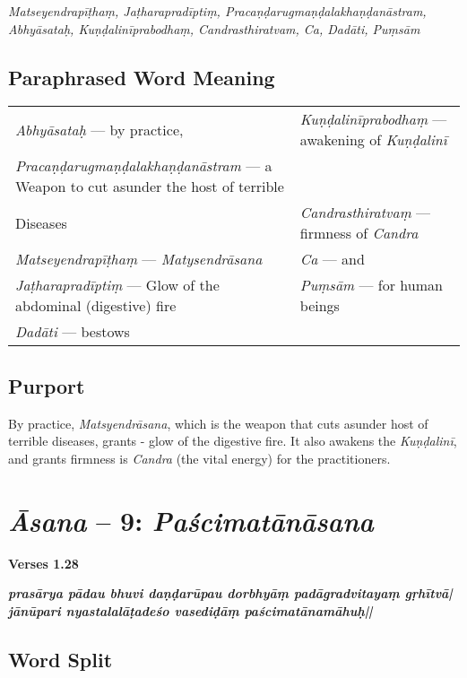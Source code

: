 \textit{Matseyendrapīṭhaṃ,  Jaṭharapradīptiṃ,  Pracaṇḍarugmaṇḍalakhaṇḍanāstram, 
Abhyāsataḥ, Kuṇḍalinīprabodhaṃ,  Candrasthiratvam, Ca, Dadāti, Puṃsām}

\subsection*{Paraphrased Word Meaning}

\begin{longtable}{>{\noindent\raggedright}p{5cm}>{\noindent\raggedright}p{5cm}}
\textit{Abhyāsataḥ} --- by practice, & \textit{Kuṇḍalinīprabodhaṃ} --- awakening of \textit{Kuṇḍalinī}\tabularnewline
\textit{Pracaṇḍarugmaṇḍala\-khaṇḍa\-nāstram} --- a Weapon to cut asunder the host  of terrible\tabularnewline 
Diseases & \textit{Candrasthiratvaṃ} --- firmness  of \textit{Candra}\tabularnewline
\textit{Matseyendrapīṭhaṃ} --- \textit{Matysendrāsana} & \textit{Ca} --- and\tabularnewline
\textit{Jaṭharapradīptiṃ} --- Glow of the  abdominal (digestive) fire & \textit{Puṃsām} --- for human beings\tabularnewline
\textit{Dadāti} --- bestows & 
\end{longtable}
 
\subsection*{Purport}

By practice, \textit{Matsyendrāsana}, which is the weapon that cuts asunder host of terrible diseases, grants - glow of the digestive fire. It also awakens the  \textit{Kuṇḍalinī}, and grants firmness is \textit{Candra} (the vital energy) for the practitioners.


\section*{\textit{Āsana} -- 9: \textit{Paścimatānāsana}}

\noindent 
\textbf{Verses 1.28}

\begin{shloka}
\textit{\textbf{prasārya pādau bhuvi daṇḍarūpau dorbhyāṃ padāgradvitayaṃ gṛhītvā|}\\
\textbf{jānūpari nyastalalāṭadeśo vasediḍāṃ paścimatānamāhuḥ||}}
\end{shloka}

\subsection*{Word Split}

